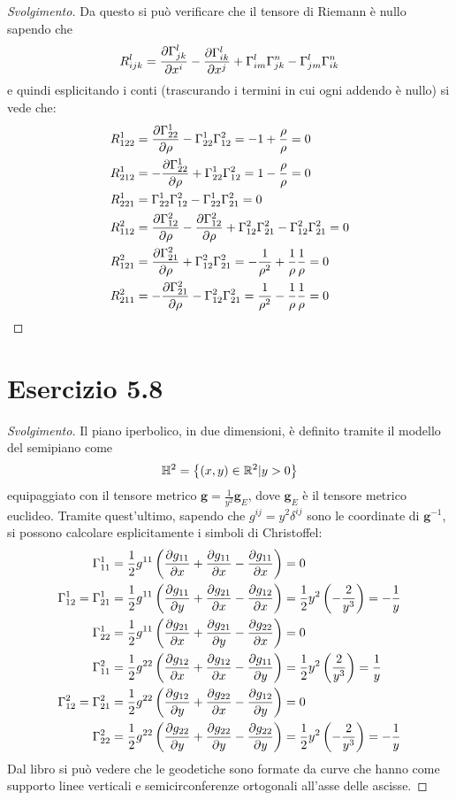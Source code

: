 \documentclass[italian,a4paper,10pt]{article}
\begin{document}
\begin{proof}[Svolgimento]
Da questo si può verificare che il tensore di Riemann è nullo sapendo che $$R_{ijk}^l = \pdv{\Gamma^l_{jk}}{x^i} - \pdv{\Gamma^l_{ik}}{x^j} + \Gamma^l_{im}\Gamma^n_{jk} - \Gamma^l_{jm}\Gamma^n_{ik}$$ e quindi esplicitando i conti (trascurando i termini in cui ogni addendo è nullo) si vede che:
\begin{align*}
R^1_{122} &= \pdv{\Gamma^1_{22}}{\rho} - \Gamma^1_{22}\Gamma^2_{12}= -1+\frac{\rho}{\rho}=0\\
R^1_{212} &= -\pdv{\Gamma^1_{22}}{\rho} + \Gamma^1_{22}\Gamma^2_{12}= 1-\frac{\rho}{\rho}=0\\
R^1_{221} &= \Gamma^1_{22}\Gamma^2_{12} - \Gamma^1_{22}\Gamma^2_{21} = 0\\
R^2_{112} &= \pdv{\Gamma^2_{12}}{\rho} - \pdv{\Gamma^2_{12}}{\rho} + \Gamma^2_{12}\Gamma^2_{21} -\Gamma^2_{12}\Gamma^2_{21} = 0\\
R^2_{121} &= \pdv{\Gamma^2_{21}}{\rho} + \Gamma^2_{12}\Gamma^2_{21}= -\frac{1}{\rho^2}+\frac{1}{\rho}\frac{1}{\rho}=0\\
R^2_{211} &= -\pdv{\Gamma^2_{21}}{\rho} - \Gamma^2_{12}\Gamma^2_{21}= \frac{1}{\rho^2}-\frac{1}{\rho}\frac{1}{\rho}=0
\end{align*}
\end{proof}

\section*{Esercizio 5.8}
\begin{proof}[Svolgimento]
Il piano iperbolico, in due dimensioni, è definito tramite il modello del semipiano come $$\mathbb H^2 = \left\lbrace (x,y)\in \mathbb R^2 | y>0 \right\rbrace $$ equipaggiato con il tensore metrico $\bm{g} = \frac{1}{y^2}\bm{g}_E$, dove $\bm{g}_E$ è il tensore metrico euclideo.
Tramite quest'ultimo, sapendo che $g^{ij}=y^2\delta^{ij}$ sono le coordinate di $\bm{g}^{-1}$, si possono calcolare esplicitamente i simboli di Christoffel:
\begin{align*}
\Gamma^1_{11} &= \frac12g^{11}\left(\pdv{g_{11}}{x}+\pdv{g_{11}}{x}-\pdv{g_{11}}{x}\right)=0\\
\Gamma^1_{12} = \Gamma^1_{21} &= \frac12g^{11}\left(\pdv{g_{11}}{y}+\pdv{g_{21}}{x}-\pdv{g_{12}}{x}\right)= \frac12y^2\left(-\frac{2}{y^3}\right)=-\frac1y\\ 
\Gamma^1_{22} &= \frac12g^{11}\left(\pdv{g_{21}}{x}+\pdv{g_{21}}{y}-\pdv{g_{22}}{x}\right)=0\\
\Gamma^2_{11} &= \frac12g^{22}\left(\pdv{g_{12}}{x}+\pdv{g_{12}}{x}-\pdv{g_{11}}{y}\right)=\frac12y^2\left(\frac{2}{y^3}\right)=\frac1y\\
\Gamma^2_{12} = \Gamma^2_{21} &= \frac12g^{22}\left(\pdv{g_{12}}{y}+\pdv{g_{22}}{x}-\pdv{g_{12}}{y}\right)=0\\
\Gamma^2_{22} &= \frac12g^{22}\left(\pdv{g_{22}}{y}+\pdv{g_{22}}{y}-\pdv{g_{22}}{y}\right)=\frac12y^2\left(-\frac{2}{y^3}\right)=-\frac1y\\
\end{align*}
Dal libro si può vedere che le geodetiche sono formate da  curve che hanno come supporto linee verticali e semicirconferenze ortogonali all'asse delle ascisse.
\end{proof}
\end{document}
